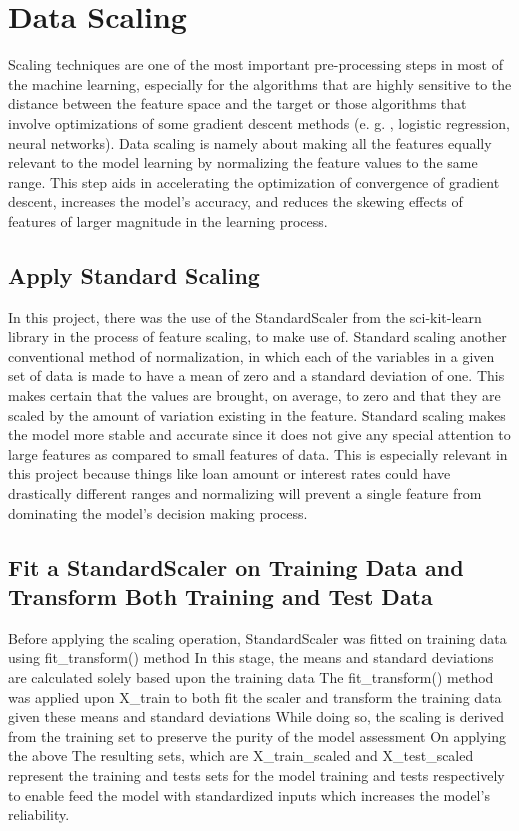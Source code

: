 \documentclass[12pt, a4paper,oneside]{book}
\numberwithin{equation}{section}
\begin{document}
\section{Data Scaling}

Scaling techniques are one of the most important pre-processing steps in most of the machine learning, especially for the algorithms that are highly sensitive to the distance between the feature space and the target or those algorithms that involve optimizations of some gradient descent methods (e. g. , logistic regression, neural networks). Data scaling is namely about making all the features equally relevant to the model learning by normalizing the feature values to the same range. This step aids in accelerating the optimization of convergence of gradient descent, increases the model’s accuracy, and reduces the skewing effects of features of larger magnitude in the learning process. 

\subsection{Apply Standard Scaling}

In this project, there was the use of the StandardScaler from the sci-kit-learn library in the process of feature scaling, to make use of. Standard scaling another conventional method of normalization, in which each of the variables in a given set of data is made to have a mean of zero and a standard deviation of one. This makes certain that the values are brought, on average, to zero and that they are scaled by the amount of variation existing in the feature. Standard scaling makes the model more stable and accurate since it does not give any special attention to large features as compared to small features of data. This is especially relevant in this project because things like loan amount or interest rates could have drastically different ranges and normalizing will prevent a single feature from dominating the model’s decision making process. 

\subsection{Fit a StandardScaler on Training Data and Transform Both Training and Test Data}

Before applying the scaling operation, StandardScaler was fitted on training data using fit\_transform() method In this stage, the means and standard deviations are calculated solely based upon the training data The fit\_transform() method was applied upon X\_train to both fit the scaler and transform the training data given these means and standard deviations While doing so, the scaling is derived from the training set to preserve the purity of the model assessment On applying the above The resulting sets, which are X\_train\_scaled and X\_test\_scaled represent the training and tests sets for the model training and tests respectively to enable feed the model with standardized inputs which increases the model’s reliability. 
\end{document}
